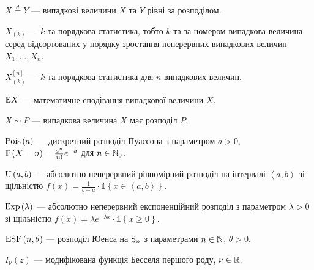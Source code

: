 $X \overset{d}{=} Y$ --- випадкові величини $X$ та $Y$ рівні за розподілом.

$X_{(k)}$ --- $k$-та порядкова статистика, тобто $k$-та за номером 
випадкова величина серед відсортованих у порядку зростання неперервних
випадкових величин $X_1, ..., X_n$.

$X_{(k)}^{[n]}$ --- $k$-та порядкова статистика для $n$ випадкових величин.

$\E X$ --- математичне сподівання випадкової величини $X$.

$X \sim P$ --- випадкова величина $X$ має розподіл $P$.

$\Poiss{a}$ --- дискретний розподіл Пуассона з параметром $a > 0$, $\P{X = n} = \frac{a^n}{n!}e^{-a}$ для $n \in \N_0$.

$\Unif{a, b}$ --- абсолютно неперервний рівномірний розподіл на інтервалі $\left<a,b\right>$ зі щільністю
$f(x) = \frac{1}{b-a} \cdot \mathds{1}\left\{x \in \left<a,b\right> \right\}$.

$\Exp{\lambda}$ --- абсолютно неперервний експоненційний розподіл з параметром $\lambda > 0$ зі щільністю
$f(x) = \lambda e^{-\lambda x} \cdot \mathds{1}\left\{x \geq 0\right\}$.

$\ESF{n, \theta}$ --- розподіл Юенса на $\Sym{n}$ з параметрами $n \in \N$, $\theta > 0$.

$I_{\nu}(z)$ --- модифікована функція Бесселя першого роду, $\nu \in \R$.